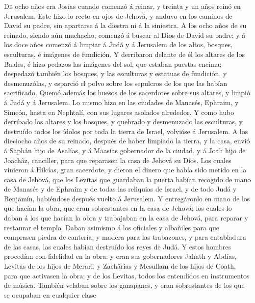  \textsc{De} ocho años era Josías cuando comenzó á reinar,
y treinta y un años reinó en Jerusalem.  Este hizo lo
recto en ojos de Jehová, y anduvo en los caminos de David su padre, sin
apartarse á la diestra ni á la siniestra.  A los ocho años
de su reinado, siendo aún muchacho, comenzó á buscar al Dios de David su
padre; y á los doce años comenzó á limpiar á Judá y á Jerusalem de los
altos, bosques, esculturas, é imágenes de fundición.  Y
derribaron delante de él los altares de los Baales, é hizo pedazos las
imágenes del sol, que estaban puestas encima; despedazó también los
bosques, y las esculturas y estatuas de fundición, y desmenuzólas, y
esparció el polvo sobre los sepulcros de los que las habían sacrificado.
 Quemó además los huesos de los sacerdotes sobre sus
altares, y limpió á Judá y á Jerusalem.  Lo mismo hizo en
las ciudades de Manasés, Ephraim, y Simeón, hasta en Nephtalí, con sus
lugares asolados alrededor.  Y como hubo derribado los
altares y los bosques, y quebrado y desmenuzado las esculturas, y
destruído todos los ídolos por toda la tierra de Israel, volvióse á
Jerusalem.  A los dieciocho años de su reinado, después de
haber limpiado la tierra, y la casa, envió á Saphán hijo de Asalías, y á
Maasías gobernador de la ciudad, y á Joah hijo de Joachâz, canciller,
para que reparasen la casa de Jehová su Dios.  Los cuales
vinieron á Hilcías, gran sacerdote, y dieron el dinero que había sido
metido en la casa de Jehová, que los Levitas que guardaban la puerta
habían recogido de mano de Manasés y de Ephraim y de todas las reliquias
de Israel, y de todo Judá y Benjamín, habiéndose después vuelto á
Jerusalem.  Y entregáronlo en mano de los que hacían la
obra, que eran sobrestantes en la casa de Jehová; los cuales lo daban á
los que hacían la obra y trabajaban en la casa de Jehová, para reparar y
restaurar el templo.  Daban asimismo á los oficiales y
albañiles para que comprasen piedra de cantería, y madera para las
trabazones, y para entabladura de las casas, las cuales habían destruído
los reyes de Judá.  Y estos hombres procedían con
fidelidad en la obra: y eran sus gobernadores Jahath y Abdías, Levitas
de los hijos de Merari; y Zachârías y Mesullam de los hijos de Coath,
para que activasen la obra; y de los Levitas, todos los entendidos en
instrumentos de música.  También velaban sobre los
ganapanes, y eran sobrestantes de los que se ocupaban en cualquier clase
